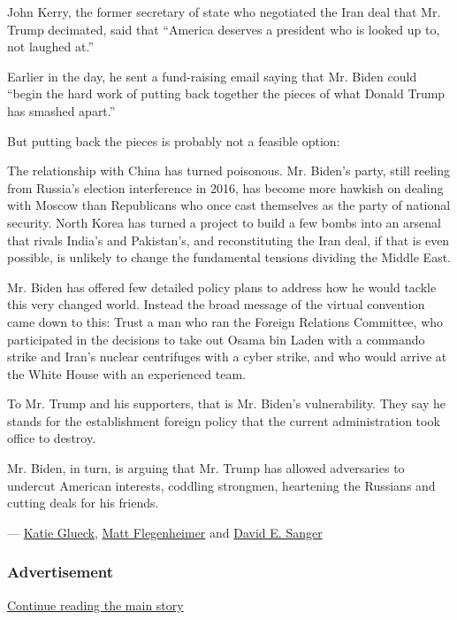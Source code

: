 John Kerry, the former secretary of state who negotiated the Iran deal
that Mr. Trump decimated, said that ``America deserves a president who
is looked up to, not laughed at.''

Earlier in the day, he sent a fund-raising email saying that Mr. Biden
could ``begin the hard work of putting back together the pieces of what
Donald Trump has smashed apart.''

But putting back the pieces is probably not a feasible option:

The relationship with China has turned poisonous. Mr. Biden's party,
still reeling from Russia's election interference in 2016, has become
more hawkish on dealing with Moscow than Republicans who once cast
themselves as the party of national security. North Korea has turned a
project to build a few bombs into an arsenal that rivals India's and
Pakistan's, and reconstituting the Iran deal, if that is even possible,
is unlikely to change the fundamental tensions dividing the Middle East.

Mr. Biden has offered few detailed policy plans to address how he would
tackle this very changed world. Instead the broad message of the virtual
convention came down to this: Trust a man who ran the Foreign Relations
Committee, who participated in the decisions to take out Osama bin Laden
with a commando strike and Iran's nuclear centrifuges with a cyber
strike, and who would arrive at the White House with an experienced
team.

To Mr. Trump and his supporters, that is Mr. Biden's vulnerability. They
say he stands for the establishment foreign policy that the current
administration took office to destroy.

Mr. Biden, in turn, is arguing that Mr. Trump has allowed adversaries to
undercut American interests, coddling strongmen, heartening the Russians
and cutting deals for his friends.

--- \href{https://www.nytimes3xbfgragh.onion/by/katie-glueck}{Katie
Glueck},
\href{https://www.nytimes3xbfgragh.onion/by/matt-flegenheimer}{Matt
Flegenheimer} and
\href{https://www.nytimes3xbfgragh.onion/by/david-e-sanger}{David E.
Sanger}

\hypertarget{advertisement}{%
\subsubsection{Advertisement}\label{advertisement}}

\protect\hyperlink{after-dfp-ad-mid1}{Continue reading the main story}


